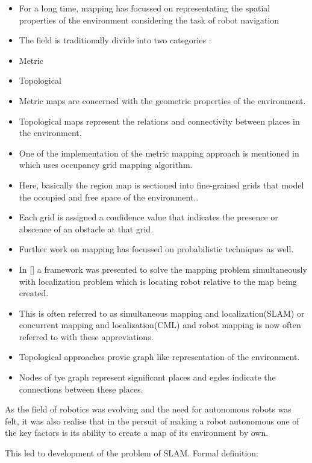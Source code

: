 \begin{itemize}
 \item For a long time, mapping has focussed on representating the spatial properties of the environment considering the task of robot navigation \cite{2, }
 \item The field is traditionally divide into two categories \cite{2, }:
 \item Metric
 \item Topological
 \item Metric maps are concerned with the geometric properties of the environment.
 \item Topological maps represent the relations and connectivity between places in the environment.
 \item One of the implementation of the metric mapping approach is mentioned in \cite{12} which uses occupancy grid mapping algorithm.
 \item Here, basically the region map is sectioned into fine-grained grids that model the occupied and free space of the environment..
 \item Each grid is assigned a confidence value that indicates the presence or abscence of an obstacle at that grid. 
 \item Further work on mapping has focussed on probabilistic techniques as well.
 \item In [] a framework was presented to solve the mapping problem simultaneously with localization problem which is locating robot relative to the map being created.
 \item This is often referred to as simultaneous mapping and localization(SLAM) or concurrent mapping and localization(CML) and robot mapping is now often referred to with these appreviations.  
 
 
 \item Topological approaches provie graph like representation of the environment.
 \item Nodes of tye graph represent significant places and egdes indicate the connections between these places.
\end{itemize}

As the field of robotics was evolving and the need for autonomous robots was felt, it was also realise that in the persuit of making 
a robot autonomous one of the key factors is its ability to create a map of its environment by own.

This led to development of the problem of SLAM.
Formal definition:


